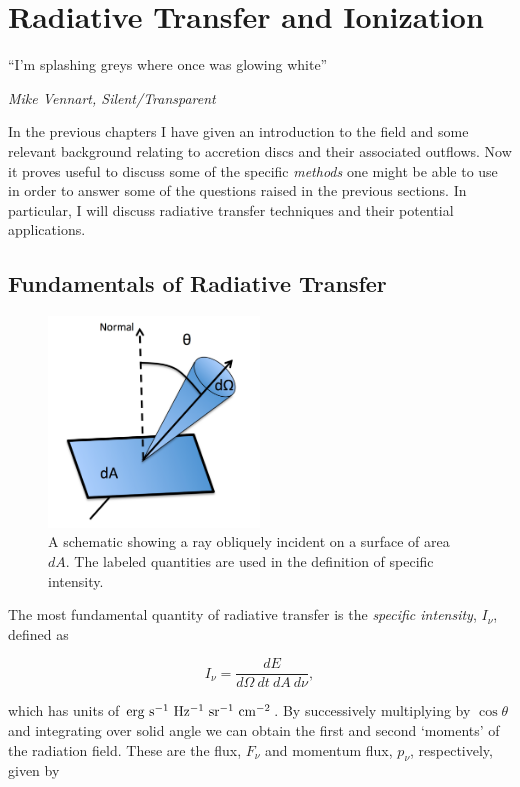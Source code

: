 \chapter{Radiative Transfer and Ionization}

\epigraph{``I'm splashing greys where once was glowing white''}{{\sl Mike Vennart, Silent/Transparent}}

In the previous chapters I have given an introduction to the field and 
some relevant background relating to accretion 
discs and their associated outflows. Now it proves useful
to discuss some of the specific {\em methods} one might be able to use
in order to answer some of the questions raised in the previous sections.
In particular, I will discuss radiative transfer techniques and 
their potential applications.

\section{Fundamentals of Radiative Transfer}

\begin{figure}
\centering
\includegraphics[width=0.5\textwidth]{figures/04-radtrans/rays_schematic.png}
\caption
{
A schematic showing a ray obliquely incident on a surface of area $dA$.
The labeled quantities are used in the definition of specific intensity.
} 
\label{fig:flowchart}
\end{figure}


The most fundamental quantity of radiative transfer is the 
{\em specific intensity}, $I_\nu$, defined as

\begin{equation}
I_\nu = \frac{dE}{d\Omega~dt~dA~d\nu},
\end{equation}

which has units of ${\rm erg~s^{-1}~Hz^{-1}~sr^{-1}~cm^{-2}}$.
By successively multiplying by $\cos \theta$ and integrating over solid angle we 
can obtain the first and second `moments' of the radiation field. These
are the flux, $F_\nu$ and momentum flux, $p_\nu$, respectively, given by

